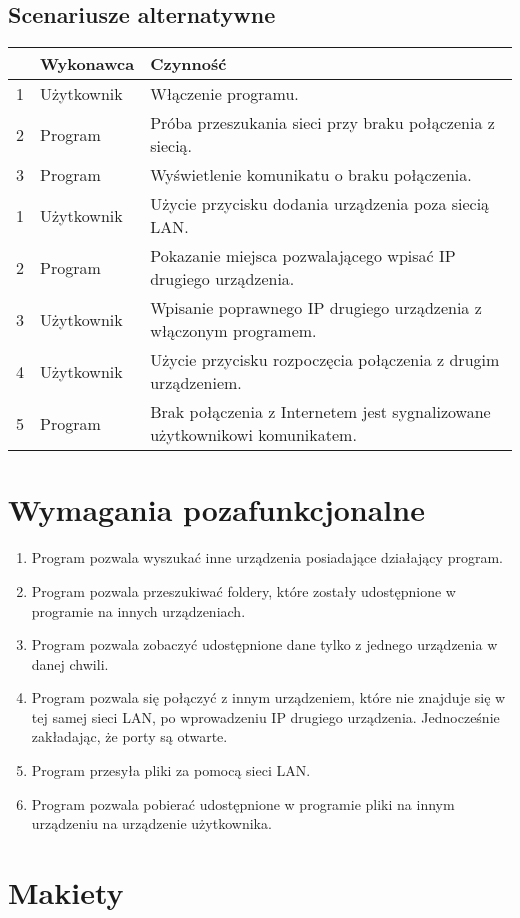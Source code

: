 \documentclass[12pt,a4paper]{article}
\begin{document}
\begin{center}
	\subsection{Scenariusze alternatywne}
	
	\begin{tabular}{|l|p{5em}|p{30em}|}
	\hline 
	 & Wykonawca & Czynność \\
	\hline
	1 & Użytkownik & Włączenie programu. \\
	\hline
	2 & Program & Próba przeszukania sieci przy braku połączenia z siecią. \\
	\hline
	3 & Program & Wyświetlenie komunikatu o braku połączenia. \\
	\hline
	\hline
	1 & Użytkownik & Użycie przycisku dodania urządzenia poza siecią LAN. \\
	\hline
	2 & Program & Pokazanie miejsca pozwalającego wpisać IP drugiego urządzenia.\\
	\hline
	3 & Użytkownik & Wpisanie poprawnego IP drugiego urządzenia z włączonym programem. \\
	\hline
	4 & Użytkownik & Użycie przycisku rozpoczęcia połączenia z drugim urządzeniem. \\ 
	\hline
	5 & Program & Brak połączenia z Internetem jest sygnalizowane użytkownikowi komunikatem. \\
	\hline
	\end{tabular} 
\end{center}

\section{Wymagania pozafunkcjonalne}

\begin{enumerate}
	\item Program pozwala wyszukać inne urządzenia posiadające działający program.
	\item Program pozwala przeszukiwać foldery, które zostały udostępnione w programie na innych urządzeniach.
	\item Program pozwala zobaczyć udostępnione dane tylko z jednego urządzenia w danej chwili.
	\item Program pozwala się połączyć z innym urządzeniem, które nie znajduje się w tej samej sieci LAN, po wprowadzeniu IP drugiego urządzenia. Jednocześnie zakładając, że porty są otwarte.
	\item Program przesyła pliki za pomocą sieci LAN.
	\item Program pozwala pobierać udostępnione w programie pliki na innym urządzeniu na urządzenie użytkownika.
	

\end{enumerate}

\section{Makiety}
\end{document}
